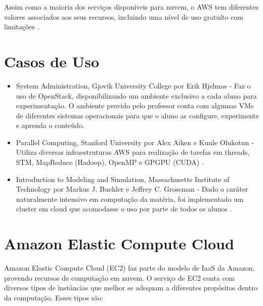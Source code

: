 \documentclass[tg]{mdtufsm}
\begin{document}
Assim como a maioria dos serviços disponíveis para nuvem, o AWS tem diferentes valores associados aos seus recursos, incluindo uma nível de uso gratuíto com limitações \cite{ec2price}. 


\section{Casos de Uso}

\begin{itemize}
\item System Administration, Gjovik University College por Erik Hjelmas - Faz o uso de OpenStack, disponibilizando um ambiente exclusivo a cada aluno para experimentação. O ambiente provido pelo professor conta com algumas VMs de diferentes sistemas operacionais para que o aluno as configure, experimente e aprenda o conteúdo.

\item Parallel Computing, Stanford University por Alex Aiken e Kunle Olukotun - Utiliza diversas infraestruturas AWS para realização de tarefas em threads, STM, MapReduce (Hadoop), OpenMP e GPGPU (CUDA) \cite{stanford}.

\item Introduction to Modeling and Simulation, Massachusetts Institute of Technology por Markus J. Buehler e Jeffrey C. Grossman - Dado o caráter naturalmente intensivo em computação da matéria, foi implementado um cluster em cloud que acomodasse o uso por parte de todos os alunos \cite{starclusterMIT}.

\end{itemize}

\section{Amazon Elastic Compute Cloud}

Amazon Elastic Compute Cloud (EC2) faz parte do modelo de IaaS da Amazon, provendo recursos de computação em nuvem. O serviço de EC2 conta com diversos tipos de instâncias que melhor se adequam a diferentes propósitos dentro da computação. Esses tipos são:
\end{document}
